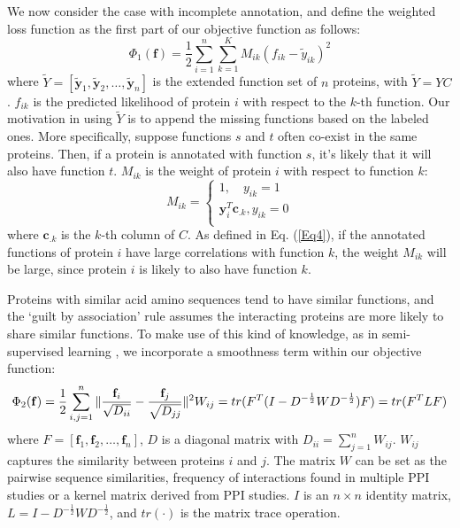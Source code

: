 \documentclass{llncs} %
\begin{document}
We now consider the case with incomplete annotation, and define the weighted loss function as the first part of our objective function as follows:
\begin{equation}
  \Phi_1(\mathbf{f})=\frac{1}{2} \sum_{i=1}^n \sum_{k=1}^{K} M_{ik}(f_{ik}-\tilde{y}_{ik})^2
  \label{Eq3}
\end{equation}
where $\tilde{Y}=[\tilde{\mathbf{y}}_1,\tilde{\mathbf{y}}_2, \ldots, \tilde{\mathbf{y}}_n]$ is the extended function set of $n$ proteins, with $\tilde{Y}=YC$. $f_{ik}$ is the predicted likelihood of protein $i$ with respect to the $k$-th function. Our motivation in using $\tilde{Y}$ is to append the missing functions based on the labeled ones. More specifically, suppose functions $s$ and $t$ often co-exist in the same proteins. Then, if a protein is annotated with function $s$, it's  likely that it will also have function $t$. $M_{ik}$ is the weight of protein $i$ with respect to function $k$:
\begin{equation}
M_{ik}=
\left\{
\begin{array}{c}
1, \quad y_{ik}=1\\
\mathbf{y}_{i}^{T} \mathbf{c}_{.k}, y_{ik}=0\\
\end{array}
\right.
\label{Eq4}
\end{equation}
where $\mathbf{c}_{.k}$ is the $k$-th column of $C$. As defined in Eq. (\ref{Eq4}), if the annotated functions of protein $i$ have large correlations with function $k$, the weight $M_{ik}$ will be large, since protein $i$ is likely to also have function $k$.

Proteins with similar acid amino sequences tend to have similar functions, and the `guilt by association' rule \cite{schwikowski2000network} assumes the interacting proteins are more likely to share similar functions. To make use of this kind of knowledge, as in semi-supervised learning \cite{zhou2004learning}, we incorporate a smoothness term within our objective function:
\begin{equation}
\Phi_2(\mathbf{f})=\frac{1}{2} \sum_{i,j=1}^n \|\frac{\mathbf{f}_i}{\sqrt{D_{ii}}}-\frac{\mathbf{f}_j}{\sqrt{D_{jj}}}\|^2 W_{ij} = tr(F^{T}(I-D^{-\frac{1}{2}}WD^{-\frac{1}{2}})F)\\
= tr(F^TLF)
\label{Eq5}
\end{equation}
where $F=[\mathbf{f}_1,\mathbf{f}_2,\ldots,\mathbf{f}_n]$, $D$ is a diagonal matrix with $D_{ii}=\sum_{j=1}^{n}W_{ij}$. $W_{ij}$ captures
the similarity between proteins $i$ and $j$. The matrix $W$  can be set as the pairwise sequence similarities,  frequency of interactions found in multiple PPI studies or
a kernel matrix derived from PPI studies. $I$ is an $n \times n $ identity matrix, $L=I-D^{-\frac{1}{2}}WD^{-\frac{1}{2}}$, and $tr(\cdot)$ is the matrix trace operation.
\end{document}
